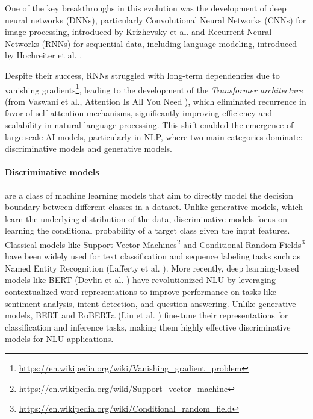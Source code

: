 One of the key breakthroughs in this evolution was the development of deep neural
networks (DNNs), particularly Convolutional Neural Networks (CNNs) for image
processing, introduced by Krizhevsky et al. \cite{articleCNN} and Recurrent
Neural Networks (RNNs) for sequential data, including language modeling,
introduced by Hochreiter et al. \cite{articleRNN}.

Despite their success, RNNs struggled with long-term dependencies due to
vanishing gradients\footnote{\url{https://en.wikipedia.org/wiki/Vanishing_gradient_problem}},
leading to the development of the \emph{Transformer architecture} (from Vaswani
et al., Attention Is All You Need \cite{vaswani2023attentionneed}), which
eliminated recurrence in favor of self-attention mechanisms, significantly improving
efficiency and scalability in natural language processing. This shift enabled
the emergence of large-scale AI models, particularly in NLP, where two main
categories dominate: discriminative models and generative models.

\paragraph{Discriminative models}
are a class of machine learning models that aim to directly model the decision
boundary between different classes in a dataset. Unlike generative models, which
learn the underlying distribution of the data, discriminative models focus on learning
the conditional probability of a target class given the input features.
Classical models like Support Vector Machines\footnote{\url{https://en.wikipedia.org/wiki/Support_vector_machine}}
and Conditional Random Fields\footnote{\url{https://en.wikipedia.org/wiki/Conditional_random_field}}
have been widely used for text classification and sequence labeling tasks such
as Named Entity Recognition (Lafferty et al. \cite{crf}). More recently, deep learning-based
models like BERT (Devlin et al. \cite{devlin2019bertpretrainingdeepbidirectional})
have revolutionized NLU by leveraging contextualized word representations to
improve performance on tasks like sentiment analysis, intent detection, and
question answering. Unlike generative models, BERT and RoBERTa (Liu et al.
\cite{liu2019robertarobustlyoptimizedbert}) fine-tune their representations for classification
and inference tasks, making them highly effective discriminative models for NLU
applications.

